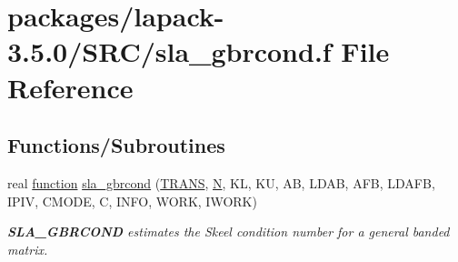 \hypertarget{sla__gbrcond_8f}{}\section{packages/lapack-\/3.5.0/\+S\+R\+C/sla\+\_\+gbrcond.f File Reference}
\label{sla__gbrcond_8f}
\subsection*{Functions/\+Subroutines}
\begin{DoxyCompactItemize}
\item 
real \hyperlink{afunc_8m_a7b5e596df91eadea6c537c0825e894a7}{function} \hyperlink{group__realGBcomputational_ga1ff0196682b9e07d55a9267e236a9be5}{sla\+\_\+gbrcond} (\hyperlink{superlu__enum__consts_8h_a0c4e17b2d5cea33f9991ccc6a6678d62a1f61e3015bfe0f0c2c3fda4c5a0cdf58}{T\+R\+A\+N\+S}, \hyperlink{polmisc_8c_a0240ac851181b84ac374872dc5434ee4}{N}, K\+L, K\+U, A\+B, L\+D\+A\+B, A\+F\+B, L\+D\+A\+F\+B, I\+P\+I\+V, C\+M\+O\+D\+E, C, I\+N\+F\+O, W\+O\+R\+K, I\+W\+O\+R\+K)
\begin{DoxyCompactList}\small\item\em {\bfseries S\+L\+A\+\_\+\+G\+B\+R\+C\+O\+N\+D} estimates the Skeel condition number for a general banded matrix. \end{DoxyCompactList}\end{DoxyCompactItemize}
